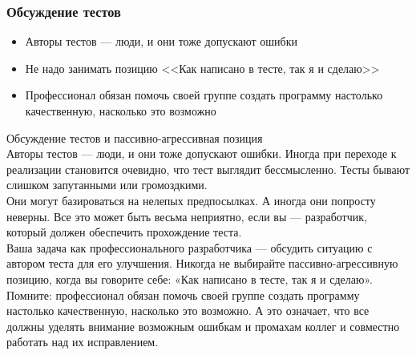\documentclass{../industrial-development}
\begin{document}
\begin{frame} \frametitle{Обсуждение тестов}
\begin{itemize}
  \item Авторы тестов — люди, и они тоже допускают ошибки
  \item Не надо занимать позицию <<Как написано в тесте, так я и сделаю>>
	\item Профессионал обязан помочь своей группе создать программу
настолько качественную, насколько это возможно
\end{itemize}
\end{frame}
\lecturenotes
Обсуждение тестов и пассивно-агрессивная позиция\\
Авторы тестов — люди, и они тоже допускают ошибки. Иногда при переходе к реализации становится очевидно, что тест выглядит бессмысленно. Тесты бывают слишком запутанными или громоздкими.\\
Они могут базироваться на нелепых предпосылках. А иногда они попросту неверны. Все это может быть весьма неприятно, если вы — разработчик, который должен обеспечить прохождение теста.\\
Ваша задача как профессионального разработчика — обсудить ситуацию с автором теста для его улучшения. Никогда не выбирайте пассивно-агрессивную позицию, когда вы говорите себе: «Как написано в тесте, так я и сделаю».\\
Помните: профессионал обязан помочь своей группе создать программу настолько качественную, насколько это возможно. А это означает, что все должны уделять внимание возможным ошибкам и промахам коллег и совместно работать над их исправлением.
\end{document}
